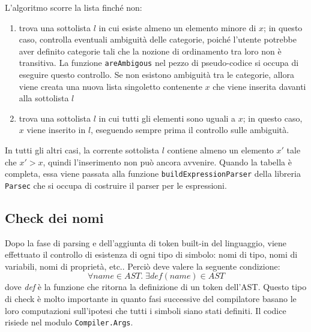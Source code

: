 \documentclass[10pt,a4paper]{article}
\begin{document}
L'algoritmo scorre la lista finché non:
\begin{enumerate}
    \item trova una sottolista $ l $ in cui esiste almeno un elemento minore di $ x $; in questo caso, controlla
    eventuali ambiguità delle categorie, poiché l'utente potrebbe aver definito categorie tali che la nozione di
    ordinamento tra loro non è transitiva. La funzione \texttt{areAmbigous} nel pezzo di pseudo-codice si occupa
    di eseguire questo controllo. Se non esistono ambiguità tra le categorie, allora viene creata una nuova lista
    singoletto contenente $ x $ che viene inserita davanti alla sottolista $ l $
    \item trova una sottolista $ l $ in cui tutti gli elementi sono uguali a $ x $; in questo caso, $ x $
    viene inserito in $ l $, eseguendo sempre prima il controllo sulle ambiguità.
\end{enumerate}
In tutti gli altri casi, la corrente sottolista $ l $ contiene almeno un elemento $ x' $ tale che
$ x' > x $, quindi l'inserimento non può ancora avvenire. Quando la tabella è completa, essa viene passata alla
funzione \texttt{buildExpressionParser} della libreria \texttt{Parsec} che si occupa di costruire il parser per le
espressioni.

\hypertarget{Check dei nomi}{\subsection{Check dei nomi}}
Dopo la fase di parsing e dell'aggiunta di token built-in del linguaggio,
viene effettuato il controllo di esistenza di ogni tipo di simbolo: nomi di tipo, nomi di variabili, nomi di proprietà,
etc.. Perciò deve valere la seguente condizione:
    \[ \forall name \in AST. \; \exists def(name) \in AST \]
dove \textit{def} è la funzione che ritorna la definizione di un token dell'AST.
Questo tipo di check è molto importante in quanto fasi successive del compilatore basano le loro computazioni
sull'ipotesi che tutti i simboli siano stati definiti. Il codice risiede nel modulo \texttt{Compiler.Args}.
\end{document}
